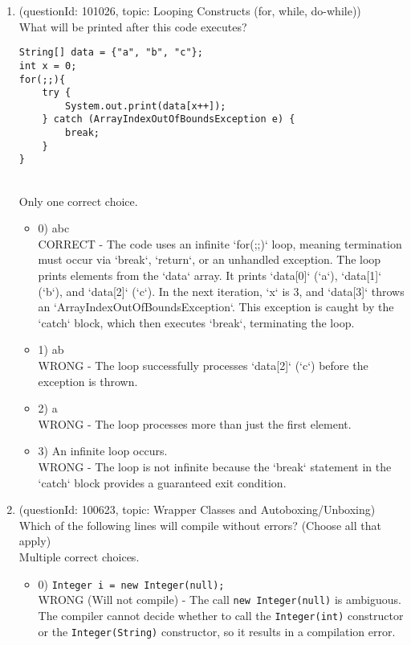 \documentclass[12pt]{article}
\begin{document}
\begin{enumerate}[label=(\arabic*)]
\begin{itemize}
\end{itemize}
\item (questionId: 101026, topic: Looping Constructs (for, while, do-while)) \\ 
What will be printed after this code executes?\n\begin{verbatim}
String[] data = {"a", "b", "c"};
int x = 0;
for(;;){
    try {
        System.out.print(data[x++]);
    } catch (ArrayIndexOutOfBoundsException e) {
        break;
    }
}
\end{verbatim}
\\ \noindent Only one correct choice. 
\begin{itemize}
\item 0) abc
 \\ 
CORRECT - The code uses an infinite `for(;;)` loop, meaning termination must occur via `break`, `return`, or an unhandled exception. The loop prints elements from the `data` array. It prints `data[0]` (`a`), `data[1]` (`b`), and `data[2]` (`c`). In the next iteration, `x` is 3, and `data[3]` throws an `ArrayIndexOutOfBoundsException`. This exception is caught by the `catch` block, which then executes `break`, terminating the loop.

\item 1) ab
 \\ 
WRONG - The loop successfully processes `data[2]` (`c`) before the exception is thrown.

\item 2) a
 \\ 
WRONG - The loop processes more than just the first element.

\item 3) An infinite loop occurs.
 \\ 
WRONG - The loop is not infinite because the `break` statement in the `catch` block provides a guaranteed exit condition.

\end{itemize}
\item (questionId: 100623, topic: Wrapper Classes and Autoboxing/Unboxing) \\ 
Which of the following lines will compile without errors? (Choose all that apply)
\\ \noindent Multiple correct choices. 
\begin{itemize}
\item 0) \verb|Integer i = new Integer(null);|
 \\ 
WRONG (Will not compile) - The call \verb|new Integer(null)| is ambiguous. The compiler cannot decide whether to call the \verb|Integer(int)| constructor or the \verb|Integer(String)| constructor, so it results in a compilation error.


\end{itemize}
\end{enumerate}
\end{document}
